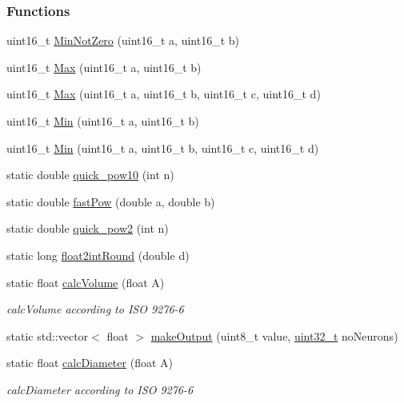 \subsubsection*{Functions}
\begin{DoxyCompactItemize}
\item 
uint16\+\_\+t \hyperlink{namespace_soil_math_add4ac871cc7f2ece16e716a5cfa61847}{Min\+Not\+Zero} (uint16\+\_\+t a, uint16\+\_\+t b)
\item 
uint16\+\_\+t \hyperlink{namespace_soil_math_a9d385c44fb7e60a278a6eee8446f7b64}{Max} (uint16\+\_\+t a, uint16\+\_\+t b)
\item 
uint16\+\_\+t \hyperlink{namespace_soil_math_a4b71f10349d360c1d7c6313bb01c988f}{Max} (uint16\+\_\+t a, uint16\+\_\+t b, uint16\+\_\+t c, uint16\+\_\+t d)
\item 
uint16\+\_\+t \hyperlink{namespace_soil_math_ad458fb6889451aa72a4a7097d10490a5}{Min} (uint16\+\_\+t a, uint16\+\_\+t b)
\item 
uint16\+\_\+t \hyperlink{namespace_soil_math_a80286ce6881c7adacfba832254a8c91b}{Min} (uint16\+\_\+t a, uint16\+\_\+t b, uint16\+\_\+t c, uint16\+\_\+t d)
\item 
static double \hyperlink{namespace_soil_math_a1e4cf56fbcab8b4c623d6976868fbaf3}{quick\+\_\+pow10} (int n)
\item 
static double \hyperlink{namespace_soil_math_ab3886ae2a670a717bbe01f94543922a0}{fast\+Pow} (double a, double b)
\item 
static double \hyperlink{namespace_soil_math_a69d186af0e164a5f98c42985aabec919}{quick\+\_\+pow2} (int n)
\item 
static long \hyperlink{namespace_soil_math_a5b0b4bcf1fecd0f3eefc2520c624f9f4}{float2int\+Round} (double d)
\item 
static float \hyperlink{namespace_soil_math_a9a50918db8a6d4eb2c1f720942b9d63c}{calc\+Volume} (float A)
\begin{DoxyCompactList}\small\item\em calc\+Volume according to I\+S\+O 9276-\/6 \end{DoxyCompactList}\item 
static std\+::vector$<$ float $>$ \hyperlink{namespace_soil_math_a210cca0b7bfd4ca8af3590a7fc5fadb5}{make\+Output} (uint8\+\_\+t value, \hyperlink{_soil_math_types_8h_a435d1572bf3f880d55459d9805097f62}{uint32\+\_\+t} no\+Neurons)
\item 
static float \hyperlink{namespace_soil_math_ae17c1f3bc0e6ed194ee3239cdd3a6486}{calc\+Diameter} (float A)
\begin{DoxyCompactList}\small\item\em calc\+Diameter according to I\+S\+O 9276-\/6 \end{DoxyCompactList}\end{DoxyCompactItemize}


